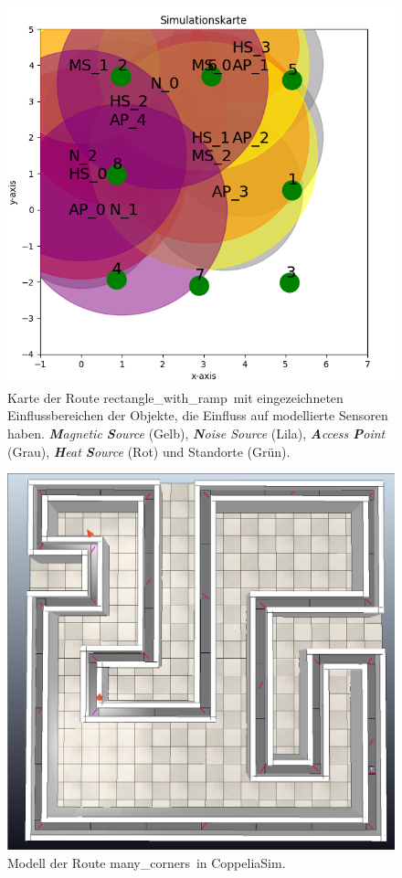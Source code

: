 \begin{figure}[h!]
    \centering
    \includegraphics[width=0.9\linewidth]{images/rectangle_with_ramp_simulation_map.png}
    \caption{Karte der Route \glqq rectangle\_with\_ramp\grqq\ mit eingezeichneten Einflussbereichen der Objekte, die Einfluss auf modellierte Sensoren haben.
    \textit{\textbf{M}agnetic \textbf{S}ource} (Gelb), \textit{\textbf{N}oise Source} (Lila), \textit{\textbf{A}ccess \textbf{P}oint} (Grau),
    \textit{\textbf{H}eat \textbf{S}ource} (Rot) und Standorte (Grün).}
    \label{fig:rectangle_with_ramp_simulation_map}
\end{figure}

\begin{figure}[h!]
    \centering
    \includegraphics[width=\linewidth]{images/many_corners.png}
    \caption{Modell der Route \glqq many\_corners\grqq\ in CoppeliaSim.}
    \label{fig:many_corners}
\end{figure}

